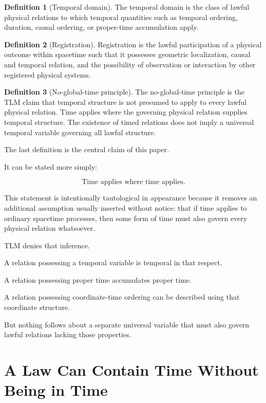\documentclass[12pt,onecolumn]{article}
\theoremstyle{plain}
\theoremstyle{definition}
\newtheorem{definition}{Definition}
\theoremstyle{remark}
\begin{document}
\begin{definition}[Temporal domain]
\label{def:temporaldomain}
The temporal domain is the class of lawful physical relations to which
temporal quantities such as temporal ordering, duration, causal ordering,
or proper-time accumulation apply.
\end{definition}

\begin{definition}[Registration]
\label{def:registration}
Registration is the lawful participation of a physical outcome within
spacetime such that it possesses geometric localization, causal and
temporal relation, and the possibility of observation or interaction by
other registered physical systems.
\end{definition}

\begin{definition}[No-global-time principle]
\label{def:noglobaltime}
The no-global-time principle is the TLM claim that temporal structure is
not presumed to apply to every lawful physical relation. Time applies where
the governing physical relation supplies temporal structure. The existence
of timed relations does not imply a universal temporal variable governing
all lawful structure.
\end{definition}

The last definition is the central claim of this paper.

It can be stated more simply:

\[
\boxed{\text{Time applies where time applies.}}
\]

This statement is intentionally tautological in appearance because it
removes an additional assumption usually inserted without notice: that if
time applies to ordinary spacetime processes, then some form of time must
also govern every physical relation whatsoever.

TLM denies that inference.

A relation possessing a temporal variable is temporal in that respect.

A relation possessing proper time accumulates proper time.

A relation possessing coordinate-time ordering can be described using that
coordinate structure.

But nothing follows about a separate universal variable that must also
govern lawful relations lacking those properties.


\section{A Law Can Contain Time Without Being in Time}
\end{document}
